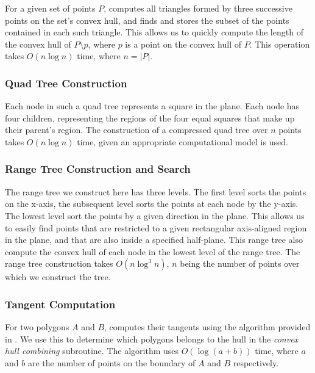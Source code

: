 \documentclass{article}
\begin{document}
For a given set of points $P$, computes all triangles formed by three successive points on the set's convex hull, and finds and stores the subset of the points contained in each such triangle. This allows us to quickly compute the length of the convex hull of $P \setminus {p}$, where $p$ is a point on the convex hull of $P$. This operation takes $O(n \log n)$ time, where $n = |P|$.
    
\subsubsection{Quad Tree Construction} 

Each node in such a quad tree represents a square in the plane. Each node has four children, representing the regions of the four equal squares that make up their parent's region. The construction of a compressed quad tree over $n$ points takes $O(n \log n)$ time, given an appropriate computational model is used.

\subsubsection{Range Tree Construction and Search} \label{subsub:range_tree_construction_and_search}

The range tree we construct here has three levels. The first level sorts the points on the x-axis, the subsequent level sorts the points at each node by the y-axis. The lowest level sort the points by a given direction in the plane. This allows us to easily find points that are restricted to a given rectangular axis-aligned region in the plane, and that are also inside a specified half-plane. This range tree also compute the convex hull of each node in the lowest level of the range tree. The range tree construction takes $O(n\log^3n)$, $n$ being the number of points over which we construct the tree.

\subsubsection{Tangent Computation} \label{subsub:tangent_computation}

For two polygons $A$ and $B$, computes their tangents using the algorithm provided in \cite{ks95}. We use this to determine which polygons belongs to the hull in the \textit{convex hull combining} subroutine. The algorithm uses $O(\log(a + b))$ time, where $a$ and $b$ are the number of points on the boundary of $A$ and $B$ respectively.
\end{document}
